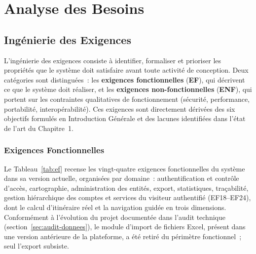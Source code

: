 \documentclass[12pt, a4paper]{report}
\begin{document}
\section{Analyse des Besoins}
\label{sec:analyse}

\subsection{Ingénierie des Exigences}
\label{ssec:exigences}

L'ingénierie des exigences consiste à identifier, formaliser et prioriser les
propriétés que le système doit satisfaire avant toute activité de conception.
Deux catégories sont distinguées~: les \textbf{exigences fonctionnelles}
(\textbf{EF}), qui décrivent ce que le système doit réaliser, et les
\textbf{exigences non-fonctionnelles} (\textbf{ENF}), qui portent sur les
contraintes qualitatives de fonctionnement (sécurité, performance, portabilité,
interopérabilité). Ces exigences sont directement dérivées des six objectifs
formulés en Introduction Générale et des lacunes identifiées dans l'état de
l'art du Chapitre~1.

\subsubsection{Exigences Fonctionnelles}

Le Tableau~\ref{tab:ef} recense les vingt-quatre exigences fonctionnelles du
système dans sa version actuelle, organisées par domaine~: authentification
et contrôle d'accès, cartographie, administration des entités, export,
statistiques, traçabilité, gestion hiérarchique des comptes et services du
visiteur authentifié (EF18--EF24), dont le calcul d'itinéraire réel et la
navigation guidée en trois dimensions. Conformément à l'évolution du projet
documentée dans l'audit technique (section~\ref{sec:audit-donnees}), le
module d'import de fichiers Excel, présent dans une version antérieure de la
plateforme, a été retiré du périmètre fonctionnel~; seul l'export subsiste.
\end{document}
